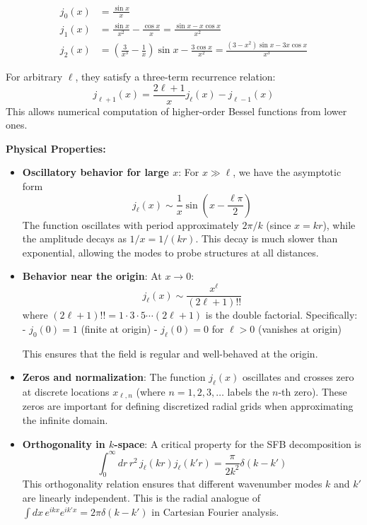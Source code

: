\begin{align}
j_0(x) &= \frac{\sin x}{x} \\
j_1(x) &= \frac{\sin x}{x^2} - \frac{\cos x}{x} = \frac{\sin x - x\cos x}{x^2}\\
j_2(x) &= \left(\frac{3}{x^3} - \frac{1}{x}\right)\sin x - \frac{3\cos x}{x^2} = \frac{(3 - x^2)\sin x - 3x\cos x}{x^3}
\end{align}

For arbitrary $\ell$, they satisfy a three-term recurrence relation:
\begin{equation}
j_{\ell+1}(x) = \frac{2\ell + 1}{x} j_\ell(x) - j_{\ell-1}(x)
\end{equation}
This allows numerical computation of higher-order Bessel functions from lower ones.

\textbf{Physical Properties:}

\begin{itemize}
    \item \textbf{Oscillatory behavior for large $x$}: For $x \gg \ell$, we have the asymptotic form
    \begin{equation}
    j_\ell(x) \sim \frac{1}{x}\sin\left(x - \frac{\ell\pi}{2}\right)
    \end{equation}
    The function oscillates with period approximately $2\pi/k$ (since $x = kr$), while the amplitude decays as $1/x = 1/(kr)$. This decay is much slower than exponential, allowing the modes to probe structures at all distances.
    
    \item \textbf{Behavior near the origin}: At $x \to 0$:
    \begin{equation}
    j_\ell(x) \sim \frac{x^\ell}{(2\ell+1)!!}
    \end{equation}
    where $(2\ell+1)!! = 1 \cdot 3 \cdot 5 \cdots (2\ell+1)$ is the double factorial. Specifically:
    - $j_0(0) = 1$ (finite at origin)
    - $j_\ell(0) = 0$ for $\ell > 0$ (vanishes at origin)
    
    This ensures that the field is regular and well-behaved at the origin.
    
    \item \textbf{Zeros and normalization}: The function $j_\ell(x)$ oscillates and crosses zero at discrete locations $x_{\ell,n}$ (where $n = 1, 2, 3, \ldots$ labels the $n$-th zero). These zeros are important for defining discretized radial grids when approximating the infinite domain.
    
    \item \textbf{Orthogonality in $k$-space}: A critical property for the SFB decomposition is
    \begin{equation}
    \int_0^\infty dr \, r^2 \, j_\ell(kr) j_\ell(k'r) = \frac{\pi}{2k^2} \delta(k - k')
    \label{eq:bessel_orthogonality}
    \end{equation}
    This orthogonality relation ensures that different wavenumber modes $k$ and $k'$ are linearly independent. This is the radial analogue of $\int dx \, e^{ikx} e^{ik'x} = 2\pi\delta(k - k')$ in Cartesian Fourier analysis.
\end{itemize}

